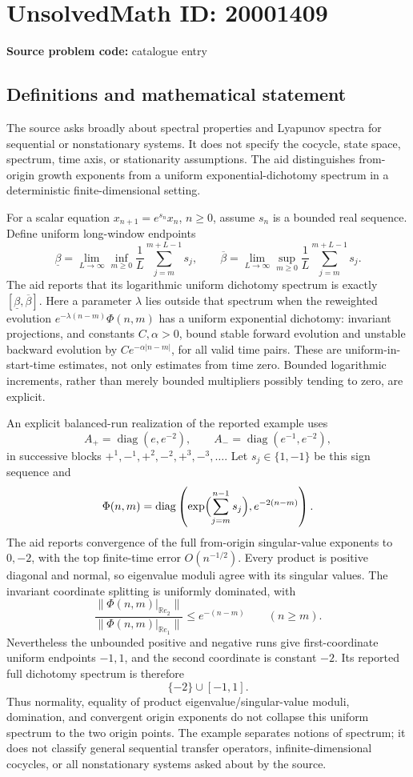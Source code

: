 \documentclass[11pt]{article}
\newcommand{\R}{\mathbb{R}}
\begin{document}
\section*{UnsolvedMath ID: 20001409}
\textbf{Source problem code:} catalogue entry
\subsection{Definitions and mathematical statement}
The source asks broadly about spectral properties and Lyapunov spectra for sequential or nonstationary systems. It does not specify the cocycle, state space, spectrum, time axis, or stationarity assumptions. The aid distinguishes from-origin growth exponents from a uniform exponential-dichotomy spectrum in a deterministic finite-dimensional setting.

For a scalar equation \(x_{n+1}=e^{s_n}x_n\), \(n\ge0\), assume \(s_n\) is a bounded real sequence. Define uniform long-window endpoints
\[
 \underline\beta=\lim_{L\to\infty}\inf_{m\ge0}
 \frac1L\sum_{j=m}^{m+L-1}s_j,\qquad
 \overline\beta=\lim_{L\to\infty}\sup_{m\ge0}
 \frac1L\sum_{j=m}^{m+L-1}s_j.
\]
The aid reports that its logarithmic uniform dichotomy spectrum is exactly \([\underline\beta,\overline\beta]\). Here a parameter \(\lambda\) lies outside that spectrum when the reweighted evolution \(e^{-\lambda(n-m)}\Phi(n,m)\) has a uniform exponential dichotomy: invariant projections, and constants \(C,\alpha>0\), bound stable forward evolution and unstable backward evolution by \(Ce^{-\alpha|n-m|}\), for all valid time pairs. These are uniform-in-start-time estimates, not only estimates from time zero. Bounded logarithmic increments, rather than merely bounded multipliers possibly tending to zero, are explicit.

An explicit balanced-run realization of the reported example uses
\[
 A_+=\operatorname{diag}(e,e^{-2}),\qquad
 A_-=\operatorname{diag}(e^{-1},e^{-2}),
\]
in successive blocks \(+^1,-^1,+^2,-^2,+^3,-^3,\ldots\). Let \(s_j\in\{1,-1\}\) be this sign sequence and
\[
 \Phi(n,m)=\operatorname{diag}
 \left(\exp\Bigl(\sum_{j=m}^{n-1}s_j\Bigr),e^{-2(n-m)}\right).
\]
The aid reports convergence of the full from-origin singular-value exponents to \(0,-2\), with the top finite-time error \(O(n^{-1/2})\). Every product is positive diagonal and normal, so eigenvalue moduli agree with its singular values. The invariant coordinate splitting is uniformly dominated, with
\[
 \frac{\|\Phi(n,m)|_{\R e_2}\|}
 {\|\Phi(n,m)|_{\R e_1}\|}\le e^{-(n-m)}\qquad(n\ge m).
\]
Nevertheless the unbounded positive and negative runs give first-coordinate uniform endpoints \(-1,1\), and the second coordinate is constant \(-2\). Its reported full dichotomy spectrum is therefore
\[
 \{-2\}\cup[-1,1].
\]
Thus normality, equality of product eigenvalue/singular-value moduli, domination, and convergent origin exponents do not collapse this uniform spectrum to the two origin points. The example separates notions of spectrum; it does not classify general sequential transfer operators, infinite-dimensional cocycles, or all nonstationary systems asked about by the source.
\end{document}
